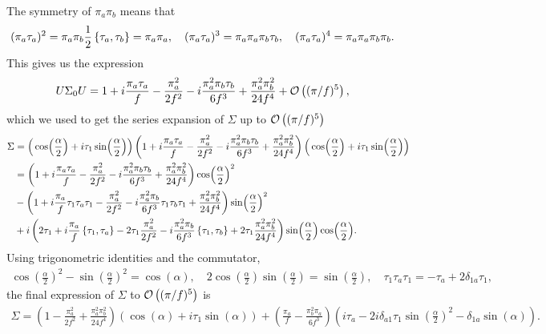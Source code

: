 \documentclass{article}
\begin{document}
The symmetry of $\pi_a\pi_b$ means that
\begin{align*}
    & (\pi_a \tau_a)^2
    = 
    \pi_a \pi_b \frac{1}{2} \acom{\tau_a}{\tau_b} 
    =
    \pi_a \pi_a, \quad
    (\pi_a \tau_a)^3
    =
    \pi_a \pi_a \pi_b \tau_b,\quad
    (\pi_a \tau_a)^4
    =
    \pi_a \pi_a \pi_b \pi_b.
\end{align*}
This gives us the expression
\begin{align*}
    & U\Sigma_0U 
    =
    1
    + i \frac{\pi_a \tau_a}{f} 
    - \frac{\pi_a^2}{2f^2}
    - i \frac{\pi_a^2\pi_b \tau_b}{6f^3}
    + \frac{\pi_a^2\pi_b^2}{24f^4}
    + \Oh[5]{(\pi/f)},
\end{align*}
which we used to get the series expansion of $\Sigma$ up to $\Oh[5]{(\pi/f)}$
\begin{align*}
    \Sigma & =  \Big( \cos(\frac{\alpha}{2}) + i \tau_1 \sin(\frac{\alpha}{2}) \Big) 
    \left(
        1
        + i \frac{\pi_a \tau_a}{f} 
        - \frac{\pi_a^2}{2f^2}
        - i \frac{\pi_a^2\pi_b \tau_b}{6f^3}
        + \frac{\pi_a^2\pi_b^2}{24f^4}    
    \right)
    \Big( \cos(\frac{\alpha}{2}) + i \tau_1 \sin(\frac{\alpha}{2}) \Big) \\
    & =
    \left(
        1
        + i \frac{\pi_a \tau_a}{f} 
        - \frac{\pi_a^2}{2f^2}
        - i \frac{\pi_a^2\pi_b \tau_b}{6f^3}
        + \frac{\pi_a^2\pi_b^2}{24f^4}    
    \right)
    \cos(\frac{\alpha}{2})^2 \\
    & -
    \left(
        1
        + i \frac{\pi_a}{f} \tau_1\tau_a\tau_1
        - \frac{\pi_a^2}{2f^2}
        - i \frac{\pi_a^2\pi_b}{6f^3} \tau_1\tau_b\tau_1
        + \frac{\pi_a^2\pi_b^2}{24f^4}
    \right)
    \sin(\frac{\alpha}{2})^2\\
    & + i
    \left(
        2 \tau_1
        + i \frac{\pi_a}{f} \acom{\tau_1}{\tau_a}
        - 2\tau_1 \frac{\pi_a^2}{2f^2}
        - i \frac{\pi_a^2\pi_b}{6f^3} \acom{\tau_1}{\tau_b}
        + 2\tau_1 \frac{\pi_a^2\pi_b^2}{24f^4}
    \right)
    \sin(\frac{\alpha}{2})\cos(\frac{\alpha}{2}).
\end{align*}
Using trigonometric identities and the commutator,
\begin{align*}
    \cos(\frac{\alpha}{2})^2 - \sin(\frac{\alpha}{2})^2 = \cos(\alpha), \quad 2 \cos(\frac{\alpha}{2})\sin(\frac{\alpha}{2}) = \sin(\frac{\alpha}{2}), \quad
    \tau_1 \tau_a \tau_1
    = -\tau_a + 2 \delta_{1a}\tau_1,
\end{align*}
the final expression of $\Sigma$ to $\Oh[5]{(\pi/f)}$ is
\begin{align}
    \Sigma =
     \left(
        1 
        - \frac{\pi_a^2}{2f^2}
        + \frac{\pi_a^2\pi_b^2}{24f^4}
    \right)
    (\cos(\alpha) + i \tau_1 \sin(\alpha))
    + 
    \left(
        \frac{\pi_a}{f} 
        - \frac{\pi_b^2\pi_a}{6f^3} 
    \right)
    \left(
        i\tau_a - 2i \delta_{a1}\tau_1\sin(\frac{\alpha}{2})^2 - \delta_{1a} \sin(\alpha)
    \right).
    \label{expansion of sigma}
\end{align}
\end{document}
